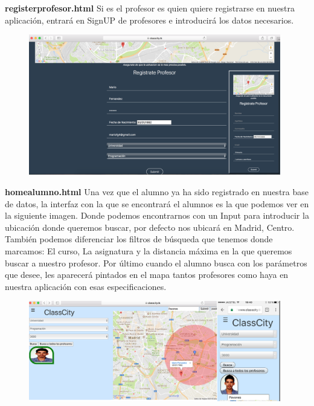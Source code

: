 \item \textbf{registerprofesor.html} Si es el profesor es quien quiere registrarse en nuestra aplicación, entrará en SignUP de profesores e introducirá los datos necesarios.
\begin{figure}[H]
    \centering
    \includegraphics[width=110mm]{memoria/LaTeX/img/templates/registerprofesor.png}
\end{figure}

\item \textbf{homealumno.html} Una vez que el alumno ya ha sido registrado en nuestra base de datos, la interfaz con la que se encontrará el alumnos es la que podemos ver en la siguiente imagen. 
Donde podemos encontrarnos con un Input para introducir la ubicación donde queremos buscar, por defecto nos ubicará en Madrid, Centro. También podemos diferenciar los filtros de búsqueda que tenemos donde marcamos: El curso, La asignatura y la distancia máxima en la que queremos buscar a nuestro profesor. Por último cuando el alumno busca con los parámetros que desee, les aparecerá pintados en el mapa tantos profesores como haya en nuestra aplicación con esas especificaciones.
\begin{figure}[H]
    \centering
    \includegraphics[width=110mm]{memoria/LaTeX/img/templates/homealumno.png}
\end{figure}

